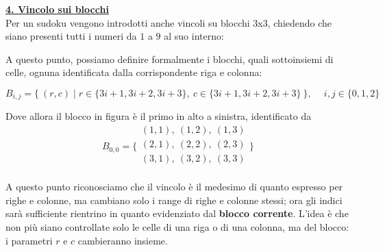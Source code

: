 \documentclass[a4paper,10pt]{article}
\begin{document}
{\begin{itemize}[label=, leftmargin=0pt]
\begin{osservazioni}
\underline{\textbf{4. Vincolo sui blocchi}}\\
Per un sudoku vengono introdotti anche vincoli su blocchi 3x3, chiedendo che siano presenti tutti i numeri da $1$ a $9$ al suo interno:

    \begin{center}
    \end{center}


A questo punto, possiamo definire formalmente i blocchi, quali sottoinsiemi di celle, ognuna identificata dalla corrispondente riga e colonna:

$$B_{i,j} = \{\  (r,c) \mid r\in \{3i+1,3i+2,3i+3\}, \ c\in \{3i+1,3i+2,3i+3\} \ \}, \quad \ i,j\in\{0,1,2\}$$

Dove allora il blocco in figura è il primo in alto a sinistra, identificato da $$B_{0,0}=\bigg\{  {\begin{array}{c}
     (1,1),\ (1,2),\ (1,3)  \\
     (2,1),\ (2,2),\ (2,3)  \\
     (3,1),\ (3,2),\ (3,3)\\
\end{array}} \bigg\} $$

A questo punto riconosciamo che il vincolo è il medesimo di quanto espresso per righe e colonne, ma cambiano solo i range di righe e colonne stessi; ora gli indici sarà sufficiente rientrino in quanto evidenziato dal \textbf{blocco corrente}. L'idea è che non più siano controllate solo le celle di una riga o di una colonna, ma del blocco: i parametri $r$ e $c$ cambieranno insieme.\\


\end{osservazioni}
\end{itemize}}
\end{document}
